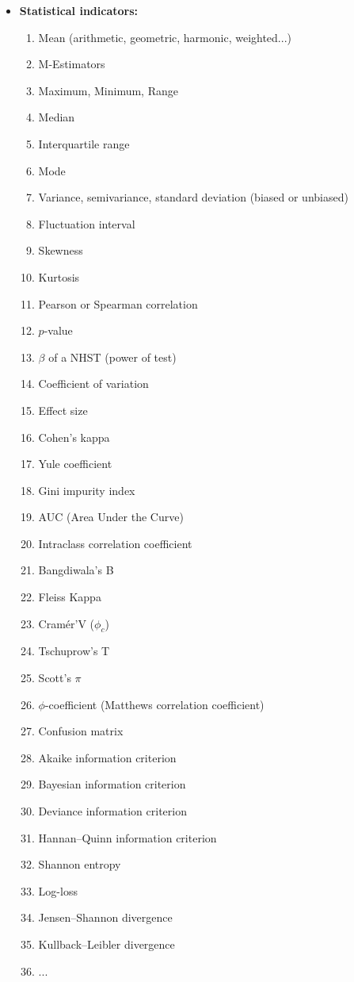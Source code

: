 \begin{itemize}
		\item \textbf{Statistical indicators:}
		\begin{multicols}{2}
		\begin{enumerate}
			\item Mean (arithmetic, geometric, harmonic, weighted...)
			\item M-Estimators
			\item Maximum, Minimum, Range
			\item Median
			\item Interquartile range
			\item Mode
			\item Variance, semivariance, standard deviation (biased or unbiased)
			\item Fluctuation interval
			\item Skewness
			\item Kurtosis
			\item Pearson or Spearman correlation
			\item $p$-value
			\item $\beta$ of a NHST (power of test)
			\item Coefficient of variation
			\item Effect size
			\item Cohen's kappa
			\item Yule coefficient
			\item Gini impurity index
			\item AUC (Area Under the Curve)
			\item Intraclass correlation coefficient
			\item Bangdiwala's B
			\item Fleiss Kappa
			\item Cramér'V ($\phi_c$)
			\item Tschuprow's T 
			\item Scott's $\pi$
			\item $\phi$-coefficient (Matthews correlation coefficient)
			\item Confusion matrix
			\item Akaike information criterion
			\item Bayesian information criterion
			\item Deviance information criterion
			\item Hannan–Quinn information criterion
			\item Shannon entropy
			\item Log-loss
			\item Jensen–Shannon divergence
			\item Kullback–Leibler divergence
			\item ...
		\end{enumerate}
		\end{multicols}
		

\end{itemize}
